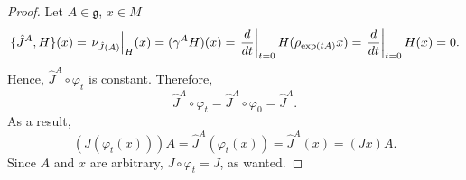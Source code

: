 \begin{proof}
  Let $A \in \mathfrak{g}$, $x \in M$ 
  \begin{equation}
    \{\hat{J}^A,H\}(x)
    = {\left. \nu_{\hat{J}(A)} \right|_{H}}(x)
    = (\gamma^A H)(x)
    = \left. \frac{d}{d t} \right|_{t = 0} H(\rho_{\exp(t A)} x)
    = \left. \frac{d}{d t} \right|_{t = 0} H(x)
    = 0.
  \end{equation}
  Hence, $\hat{J}^A \circ \varphi_t$ is constant.
  Therefore,
  \begin{equation}
    \hat{J}^A \circ \varphi_t = \hat{J}^A \circ \varphi_0 = \hat{J}^A.
  \end{equation}
  As a result,
  \begin{equation}
    (J(\varphi_t(x))) A
    = \hat{J}^A(\varphi_t(x))
    = \hat{J}^A(x)
    = (J x) A.
  \end{equation}
  Since $A$ and $x$ are arbitrary, $J \circ \varphi_t = J$, as wanted.
\end{proof}
